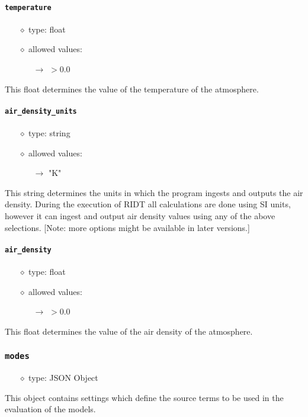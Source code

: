 \documentclass[]{article}
\def\code#1{\texttt{#1}}
\begin{document}
\paragraph{\code{temperature}}\label{sec:temperature}
\begin{itemize}
    \item[$\diamond$] type: float 
    \item[$\diamond$] allowed values:
    \begin{itemize}
        \item[$\rightarrow$] $>0.0$ 
    \end{itemize}
\end{itemize}
This float determines the value of the temperature of the atmosphere.

\paragraph{\code{air\_density\_units}}\label{sec:air_densityunits}
\begin{itemize}
    \item[$\diamond$] type: string 
    \item[$\diamond$] allowed values:
    \begin{itemize}
        \item[$\rightarrow$] "K"
    \end{itemize}
\end{itemize}
This string determines the units in which the program ingests and outputs the
air density. During the execution of RIDT all calculations are done using SI units,
however it can ingest and output air density values using any of the above
selections. [Note: more options might be available in later versions.]

\paragraph{\code{air\_density}}\label{sec:air_density}
\begin{itemize}
    \item[$\diamond$] type: float 
    \item[$\diamond$] allowed values:
    \begin{itemize}
        \item[$\rightarrow$] $>0.0$ 
    \end{itemize}
\end{itemize}
This float determines the value of the air density of the atmosphere.

\subsubsection{\code{modes}}
\begin{itemize}
    \item[$\diamond$] type: JSON Object 
\end{itemize}
This object contains settings which define the source terms to be used in the
evaluation of the models.
\end{document}
